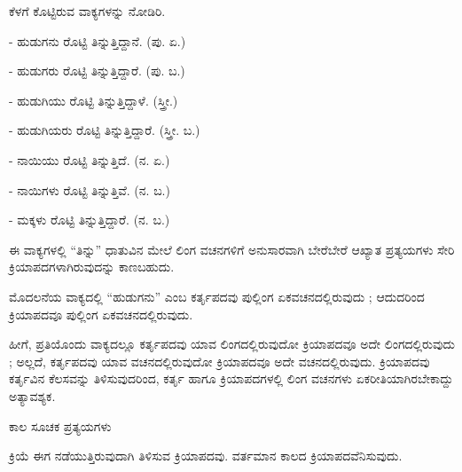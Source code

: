 
\noindent\hspace*{2.2em}ಕೆಳಗೆ ಕೊಟ್ಟಿರುವ ವಾಕ್ಯಗಳನ್ನು ನೋಡಿರಿ.\par

\indent - ಹುಡುಗನು ರೊಟ್ಟಿ ತಿನ್ನುತ್ತಿದ್ದಾನೆ. (ಪು. ಏ.)\par

\indent - ಹುಡುಗರು ರೊಟ್ಟಿ ತಿನ್ನುತ್ತಿದ್ದಾರೆ. (ಪು. ಬ.)\par

\indent - ಹುಡುಗಿಯು ರೊಟ್ಟಿ ತಿನ್ನುತ್ತಿದ್ದಾಳೆ. (ಸ್ತ್ರೀ.)\par

\indent - ಹುಡುಗಿಯರು ರೊಟ್ಟಿ ತಿನ್ನುತ್ತಿದ್ದಾರೆ. (ಸ್ತ್ರೀ. ಬ.)\par

\indent - ನಾಯಿಯು ರೊಟ್ಟಿ ತಿನ್ನುತ್ತಿದೆ. (ನ. ಏ.)\par

\indent - ನಾಯಿಗಳು ರೊಟ್ಟಿ ತಿನ್ನುತ್ತಿವೆ. (ನ. ಬ.)\par

\indent - ಮಕ್ಕಳು ರೊಟ್ಟಿ ತಿನ್ನುತ್ತಿದ್ದಾರೆ. (ನ. ಬ.)\par

\indent ಈ ವಾಕ್ಯಗಳಲ್ಲಿ “ತಿನ್ನು” ಧಾತುವಿನ ಮೇಲೆ ಲಿಂಗ ವಚನಗಳಿಗೆ ಅನುಸಾರವಾಗಿ ಬೇರೆಬೇರೆ ಆಖ್ಯಾತ ಪ್ರತ್ಯಯಗಳು ಸೇರಿ ಕ್ರಿಯಾಪದಗಳಾಗಿರುವುದನ್ನು ಕಾಣಬಹುದು.\par

\indent ಮೊದಲನೆಯ ವಾಕ್ಯದಲ್ಲಿ “ಹುಡುಗನು” ಎಂಬ ಕರ್ತೃಪದವು ಪುಲ್ಲಿಂಗ ಏಕವಚನದಲ್ಲಿರುವುದು ; ಆದುದರಿಂದ ಕ್ರಿಯಾಪದವೂ ಪುಲ್ಲಿಂಗ ಏಕವಚನದಲ್ಲಿರುವುದು.\par

\indent ಹೀಗೆ, ಪ್ರತಿಯೊಂದು ವಾಕ್ಯದಲ್ಲೂ ಕರ್ತೃಪದವು ಯಾವ ಲಿಂಗದಲ್ಲಿರುವುದೋ ಕ್ರಿಯಾಪದವೂ ಅದೇ ಲಿಂಗದಲ್ಲಿರುವುದು ; ಅಲ್ಲದೆ, ಕರ್ತೃಪದವು ಯಾವ ವಚನದಲ್ಲಿರುವುದೋ ಕ್ರಿಯಾಪದವೂ ಅದೇ ವಚನದಲ್ಲಿರುವುದು. ಕ್ರಿಯಾಪದವು ಕರ್ತೃವಿನ ಕೆಲಸವನ್ನು ತಿಳಿಸುವುದರಿಂದ, ಕರ್ತೃ ಹಾಗೂ ಕ್ರಿಯಾಪದಗಳಲ್ಲಿ ಲಿಂಗ ವಚನಗಳು ಏಕರೀತಿಯಾಗಿರಬೇಕಾದ್ದು ಅತ್ಯಾವಶ್ಯಕ.\par

\indent ಕಾಲ ಸೂಚಕ ಪ್ರತ್ಯಯಗಳು\par

\vspace{4pt plus 4pt minus 1pt}\hspace{0.5em}ಕ್ರಿಯೆ ಈಗ ನಡೆಯುತ್ತಿರುವುದಾಗಿ ತಿಳಿಸುವ ಕ್ರಿಯಾಪದವು. ವರ್ತಮಾನ ಕಾಲದ ಕ್ರಿಯಾಪದವೆನಿಸುವುದು.\par
